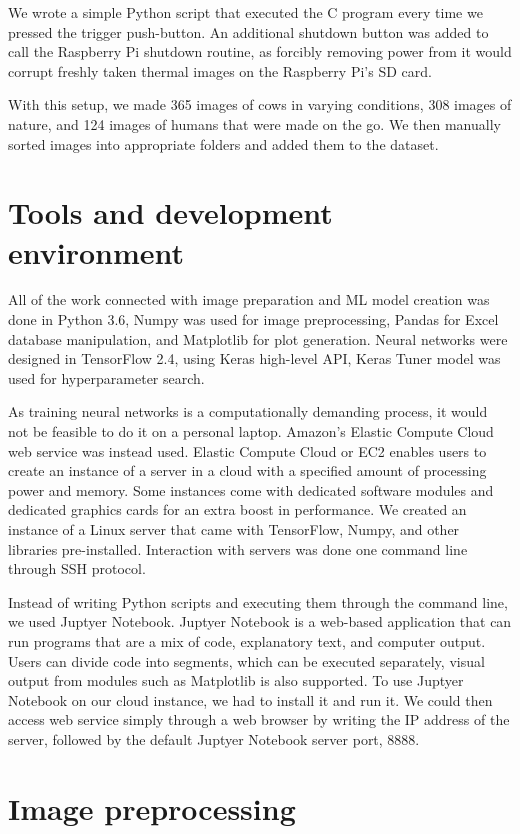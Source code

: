 We wrote a simple Python script that executed the C program every time we pressed the trigger push-button.
An additional shutdown button was added to call the Raspberry Pi shutdown routine, as forcibly removing power from it would corrupt freshly taken thermal images on the Raspberry Pi's SD card.

With this setup, we made 365 images of cows in varying conditions, 308 images of nature, and 124 images of humans that were made on the go.
We then manually sorted images into appropriate folders and added them to the dataset.


\section{ Tools and development environment}

All of the work connected with image preparation and ML model creation was done in Python 3.6, Numpy was used for image preprocessing, Pandas for Excel database manipulation, and Matplotlib for plot generation.
Neural networks were designed in TensorFlow 2.4, using Keras high-level API, Keras Tuner model was used for hyperparameter search.

As training neural networks is a computationally demanding process, it would not be feasible to do it on a personal laptop.
Amazon's Elastic Compute Cloud web service was instead used.
Elastic Compute Cloud or EC2 enables users to create an instance of a server in a cloud with a specified amount of processing power and memory.
Some instances come with dedicated software modules and dedicated graphics cards for an extra boost in performance.
We created an instance of a Linux server that came with TensorFlow, Numpy, and other libraries pre-installed.
Interaction with servers was done one command line through SSH protocol.

Instead of writing Python scripts and executing them through the command line, we used Juptyer Notebook. 
Juptyer Notebook is a web-based application that can run programs that are a mix of code, explanatory text, and computer output.
Users can divide code into segments, which can be executed separately, visual output from modules such as Matplotlib is also supported.
To use Juptyer Notebook on our cloud instance, we had to install it and run it.
We could then access web service simply through a web browser by writing the IP address of the server, followed by the default Juptyer Notebook server port, 8888.


\section{ Image preprocessing}

